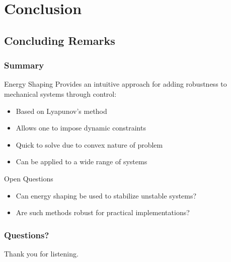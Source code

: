 \section{Conclusion}
\showtoc

\subsection{Concluding Remarks}

\begin{frame}
  \frametitle{Summary}
  \begin{block}{Energy Shaping}
    Provides an intuitive approach for adding robustness to mechanical systems through control:
    \begin{itemize}
      \item Based on Lyapunov's method
      \item Allows one to impose dynamic constraints
      \item Quick to solve due to convex nature of problem
      \item Can be applied to a wide range of systems
    \end{itemize}
  \end{block}

  \begin{block}{Open Questions}
    \begin{itemize}
    \item Can energy shaping be used to stabilize unstable systems?
    \item Are such methods robust for practical implementations?
    \end{itemize}
  \end{block}
\end{frame}

\begin{frame}
  \frametitle{Questions?}

  Thank you for listening.
\end{frame}

